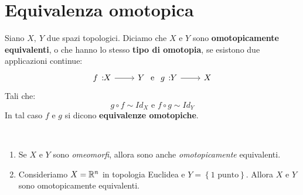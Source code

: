 \section{Equivalenza omotopica}
\begin{define}
	Siano $X,\ Y$ due spazi topologici. Diciamo che $X$ e $Y$ sono \textbf{omotopicamente equivalenti}, o che hanno lo stesso \textbf{tipo di omotopia}, se esistono due applicazioni continue:
	\begin{equation}
		\funz{f}{X}{Y}\text{ e }\funz{g}{Y}{X}
	\end{equation}
Tali che:
\begin{equation}
	g\circ f\sim Id_X\text{ e }f\circ g\sim Id_Y
\end{equation}
In tal caso $f$ e $g$ si dicono \textbf{equivalenze omotopiche}.
\end{define}
\begin{observe}~{}
\begin{enumerate}
	\item Se $X$ e $Y$ sono \textit{omeomorfi}, allora sono anche \textit{omotopicamente} equivalenti.
	\item Consideriamo $X=\mathbb{R}^n$ in topologia Euclidea e $Y=\left\{1\text{ punto}\right\}$. Allora $X$ e $Y$ sono omotopicamente equivalenti.
\end{enumerate}
\end{observe}
